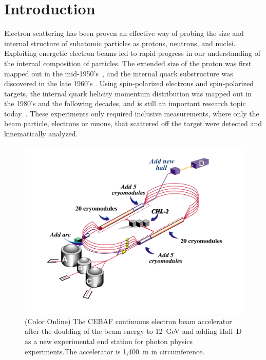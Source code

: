 \documentclass[final,3p,twocolumn]{elsarticle}
\begin{document}
\linenumbers
\section{Introduction}

Electron scattering has been proven an effective way of probing the size and internal structure of subatomic
particles as protons, neutrons, and nuclei. Exploiting energetic electron beams led to rapid progress in our
understanding of the internal composition of particles. The extended size of the proton was first mapped out in
the mid-1950's~\cite{Mcallister:1956ng}, and the internal quark substructure was discovered in the late 1960's
\cite{Breidenbach:1969kd}. Using spin-polarized electrons and spin-polarized targets, the internal quark helicity
momentum distribution was mapped out in the 1980's and the following decades, and is still an important research
topic today~\cite{Kuhn:2008sy}. These experiments only required inclusive measurements, where only the beam
particle, electrons or muons, that scattered off the target were detected and kinematically analyzed.  

\begin{figure}[ht]
\centerline{\includegraphics[width=1.8\columnwidth]{cebaf.pdf}}
\caption{ (Color Online) The CEBAF continuous electron beam accelerator after the doubling of the beam energy to 12~GeV and 
adding Hall~D as a new experimental end station for photon physics experiments.The accelerator is 1,400~m in
circumference.}
\label{cebaf12}
\end{figure} 
\end{document}
